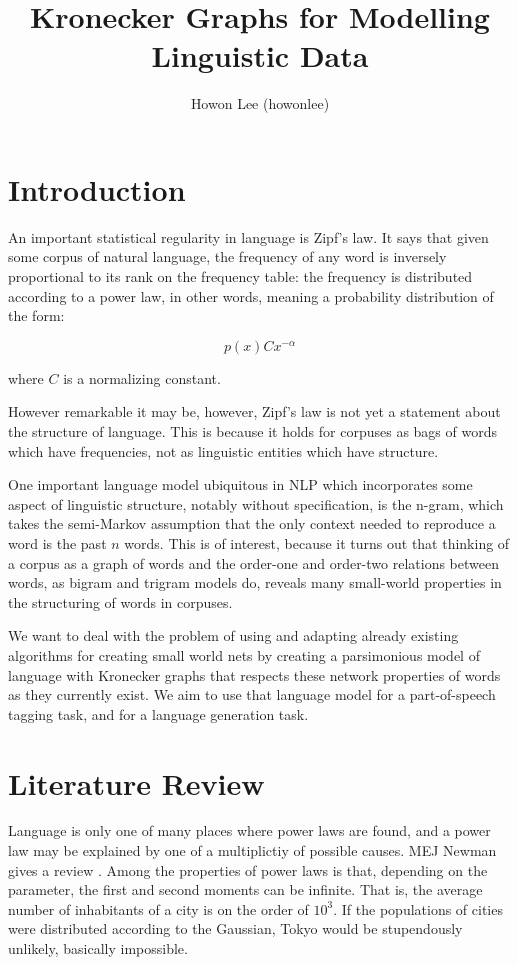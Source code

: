\documentclass[12pt]{article}
\begin{document}
\title{Kronecker Graphs for Modelling Linguistic Data}
\author{Howon Lee (howonlee)}
\maketitle

\section{Introduction}

An important statistical regularity in language is Zipf's law. It says that given some corpus of natural language, the frequency of any word is inversely proportional to its rank on the frequency table: the frequency is distributed according to a power law, in other words, meaning a probability distribution of the form:

$$p(x) Cx^{-\alpha} $$

where $C$ is a normalizing constant.

However remarkable it may be, however, Zipf's law is not yet a statement about the structure of language. This is because it holds for corpuses as bags of words which have frequencies, not as linguistic entities which have structure. \cite{smallworldlang}

One important language model ubiquitous in NLP which incorporates some aspect of linguistic structure, notably without specification, is the n-gram, which takes the semi-Markov assumption that the only context needed to reproduce a word is the past $n$ words. This is of interest, because it turns out that thinking of a corpus as a graph of words and the order-one and order-two relations between words, as bigram and trigram models do, reveals many small-world properties in the structuring of words in corpuses.

We want to deal with the problem of using and adapting already existing algorithms for creating small world nets by creating a parsimonious model of language with Kronecker graphs that respects these network properties of words as they currently exist. We aim to use that language model for a part-of-speech tagging task, and for a language generation task.

\section{Literature Review}

Language is only one of many places where power laws are found, and a power law may be explained by one of a multiplictiy of possible causes. MEJ Newman gives a review \cite{mejpowerlaw}. Among the properties of power laws is that, depending on the parameter, the first and second moments can be infinite. That is, the average number of inhabitants of a city is on the order of $10^3$. If the populations of cities were distributed according to the Gaussian, Tokyo would be stupendously unlikely, basically impossible.
\end{document}
